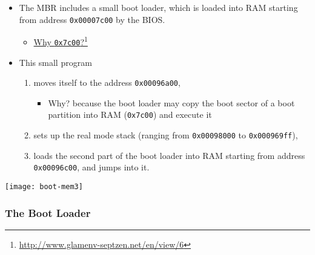 \begin{minipage}{.65\textwidth}
  \begin{itemize}
  \item The MBR includes a small boot loader, which is loaded into RAM starting from
    address \texttt{0x00007c00} by the BIOS.

    \begin{itemize}
    \item \href{http://www.glamenv-septzen.net/en/view/6}{Why \texttt{0x7c00}?}\footnote{\url{http://www.glamenv-septzen.net/en/view/6}}
    \end{itemize}

  \item This small program
    \begin{enumerate}
    \item moves itself to the address \texttt{0x00096a00},
      \begin{itemize}
      \item Why? because the boot loader may copy the boot sector of a boot
        partition into RAM (\texttt{0x7c00}) and execute it
      \end{itemize}
    \item sets up the real mode stack (ranging from \texttt{0x00098000} to
      \texttt{0x000969ff}),
    \item loads the second part of the boot loader into RAM starting from address
      \texttt{0x00096c00}, and jumps into it.
    \end{enumerate}
  \end{itemize}
\end{minipage}\hfill
\begin{minipage}{.3\textwidth}
  \texttt{[image: boot-mem3]}
\end{minipage}

\subsubsection{The Boot Loader}

